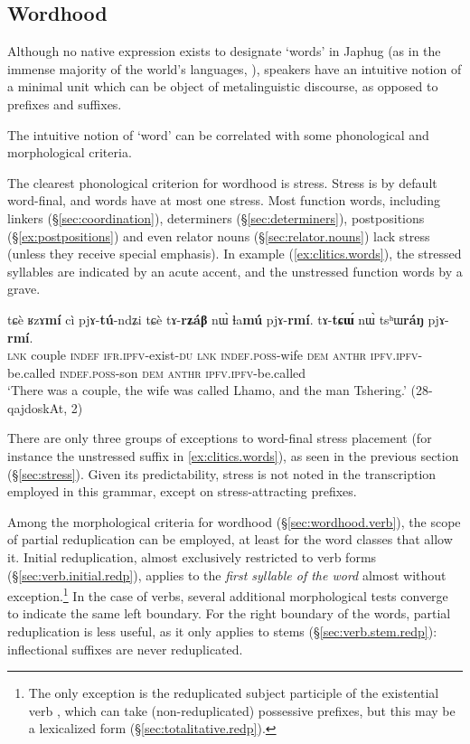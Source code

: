 \subsection{Wordhood} \label{sec:wordhood}
Although no native expression exists to designate `words' in Japhug (as in the immense majority of the world's languages, \citealt{dixon02word}), speakers have an intuitive notion of a minimal unit  which can be object of metalinguistic discourse, as opposed to prefixes and suffixes.

The intuitive notion of `word' can be correlated with some phonological and morphological criteria.

The clearest phonological criterion for wordhood is stress. Stress is by default word-final, and words have at most one stress. Most function words, including linkers (§\ref{sec:coordination}), determiners (§\ref{sec:determiners}), postpositions (§\ref{ex:postpositions}) and even relator nouns (§\ref{sec:relator.nouns}) lack stress (unless they receive special emphasis). In example (\ref{ex:clitics.words}), the stressed syllables are indicated by an acute accent, and the unstressed function words by a grave.

\begin{exe}
	\ex \label{ex:clitics.words}
	\gll  tɕè ʁzɤ\textbf{mí} cì pjɤ-\textbf{tú}-ndʑi tɕè tɤ-\textbf{rʑáβ} nɯ̀ ɬa\textbf{mú} pjɤ-\textbf{rmí}. tɤ-\textbf{tɕɯ́} nɯ̀ tsʰɯ\textbf{ráŋ} pjɤ-\textbf{rmí}. \\
	\textsc{lnk} couple \textsc{indef} \textsc{ifr}.\textsc{ipfv}-exist-\textsc{du} \textsc{lnk} \textsc{indef}.\textsc{poss}-wife \textsc{dem}  \textsc{anthr} \textsc{ipfv}.\textsc{ipfv}-be.called \textsc{indef}.\textsc{poss}-son \textsc{dem}   \textsc{anthr} \textsc{ipfv}.\textsc{ipfv}-be.called  \\
	\glt `There was a couple, the wife was called Lhamo, and the man Tshering.' (28-qajdoskAt, 2)
\end{exe}

There are only three groups of exceptions to word-final stress placement (for instance the unstressed suffix  in \ref{ex:clitics.words}), as seen in the previous section (§\ref{sec:stress}). Given its predictability, stress is not noted in the transcription employed in this grammar, except on stress-attracting prefixes.

Among the morphological criteria for wordhood (§\ref{sec:wordhood.verb}), the scope of partial reduplication can be employed, at least for the word classes that allow it. Initial reduplication, almost exclusively restricted to verb forms (§\ref{sec:verb.initial.redp}), applies to the \textit{first syllable of the word} almost without exception.\footnote{The only exception is the reduplicated subject participle  of the existential verb , which can take (non-reduplicated) possessive prefixes, but this may be a lexicalized form (§\ref{sec:totalitative.redp}). }   In the case of verbs, several additional morphological tests converge to indicate the same left boundary. For the right boundary of the words, partial reduplication is less useful, as it only applies to stems (§\ref{sec:verb.stem.redp}): inflectional suffixes are never reduplicated.

